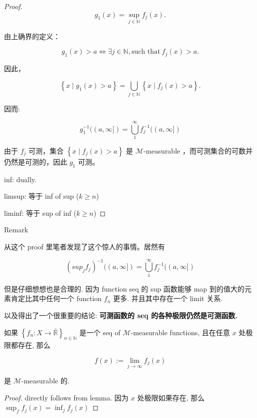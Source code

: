 \documentclass{qlnotes-export}
\begin{document}
\begin{proof}

\[g_{1}(x) = \sup\limits_{j \in {\mathbb{N}}}f_{j}(x).\]

由上确界的定义：

\[g_{1}(x) > a\Leftrightarrow\exists j \in {\mathbb{N}},\text{such that}\ f_{j}(x) > a.\]

因此，

\[\left\{ {x \mid g_{1}(x) > a} \right\} = \bigcup\limits_{j \in {\mathbb{N}}}\left\{ {x \mid f_{j}(x) > a} \right\}.\]

因而:

\[g_{1}^{- 1}((a,\infty\rbrack) = \bigcup\limits_{1}^{\infty}f_{j}^{- 1}((a,\infty\rbrack)\]

由于 \(f_{j}\) 可测，集合 \(\left\{ {x \mid f_{j}(x) > a} \right\}\) 是 \(\mathcal{M}\)-measurable ，而可测集合的可数并仍然是可测的，因此 \(g_{1}\) 可测。

inf: dually.

limsup: 等于 inf of sup (\(k \geq n\))

liminf: 等于 sup of inf (\(k \geq n\))

\end{proof}

\begin{qlremark}{Remark}

从这个 proof 里笔者发现了这个惊人的事情。居然有

\[(sup_{j}f_{j})^{- 1}((a,\infty\rbrack) = \bigcup\limits_{1}^{\infty}f_{j}^{- 1}((a,\infty\rbrack)\]

但是仔细想想也是合理的. 因为 function seq 的 sup 函数能够 map 到的值大的元素肯定比其中任何一个 function \(f_{n}\) 更多. 并且其中存在一个 limit 关系.

以及得出了一个很重要的结论: \textbf{可测函数的 seq 的各种极限仍然是可测函数.}

\end{qlremark}

\begin{corollary}

如果 \(\left\{ {f_{n}:X\rightarrow\bar{\mathbb{R}}} \right\}_{n \in {\mathbb{N}}}\) 是一个 seq of \(\mathcal{M}\)-measurable functions, 且在任意 \(x\) 处极限都存在, 那么

\[f(x) := \lim\limits_{j\rightarrow\infty}f_{j}(x)\]

是 \(\mathcal{M}\)-measurable 的.

\end{corollary}

\begin{proof}

directly follows from lemma. 因为 \(x\) 处极限如果存在, 那么 \(\sup_{f}f_{j}(x) = \inf_{j}f_{j}(x)\)

\end{proof}
\end{document}
